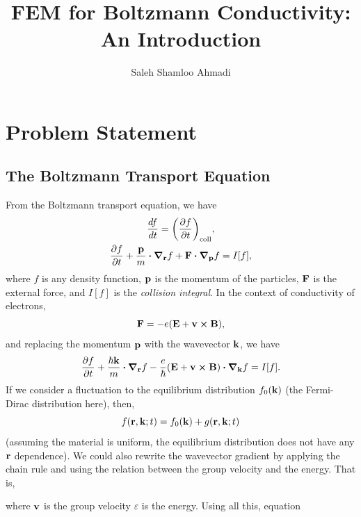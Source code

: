 \documentclass[12pt]{article}
\title{FEM for Boltzmann Conductivity: An Introduction}
\author{Saleh Shamloo Ahmadi}
\begin{document}
\maketitle
\section{Problem Statement}
\subsection{The Boltzmann Transport Equation}
From the Boltzmann transport equation, we have
\begin{gather}
    \dv{f}{t} = \qty(\pdv{f}{t})_{\text{coll}}, \\
    \pdv{f}{t} + \frac{\vb{p}}{m}\vdot\grad_{\vb{r}} f + \vb{F}\vdot\grad_{\vb{p}}f = I[f],
\end{gather}
where $f$ is any density function, $\vb{p}$ is the momentum of the particles, $\vb{F}$ is the
external force, and $I[f]$ is the \emph{collision integral}. In the context of conductivity of
electrons,
\begin{equation}
    \vb{F} = -e\qty(\vb{E} + \vb{v}\cross\vb{B}),
\end{equation}
and replacing the momentum $\vb{p}$ with the wavevector $\vb{k}$, we have
\begin{equation}
    \pdv{f}{t} + \frac{\hbar\vb{k}}{m}\vdot\grad_{\vb{r}} f
    - \frac{e}{\hbar}\qty(\vb{E} + \vb{v}\cross\vb{B})\vdot\grad_{\vb{k}}f = I[f].
    \label{eq:boltzmann_general}
\end{equation}
If we consider a fluctuation to the equilibrium distribution $f_0(\vb{k})$ (the Fermi-Dirac
distribution here), then,
\begin{equation}
    f(\vb{r}, \vb{k}; t) = f_0(\vb{k}) + g(\vb{r}, \vb{k}; t)
\end{equation}
(assuming the material is uniform, the equilibrium distribution does not have any $\vb{r}$
dependence). We could also rewrite the wavevector gradient by applying the chain rule and using
the relation between the group velocity and the energy. That is,
where $\vb{v}$ is the group velocity $\varepsilon$ is the energy. Using all this, equation
\end{document}
